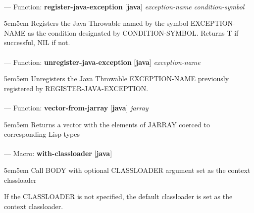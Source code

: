 \paragraph{}
\label{JAVA:REGISTER-JAVA-EXCEPTION}
--- Function: \textbf{register-java-exception} [\textbf{java}] \textit{exception-name condition-symbol}

\begin{adjustwidth}{5em}{5em}
Registers the Java Throwable named by the symbol EXCEPTION-NAME as the condition designated by CONDITION-SYMBOL.  Returns T if successful, NIL if not.
\end{adjustwidth}

\paragraph{}
\label{JAVA:UNREGISTER-JAVA-EXCEPTION}
--- Function: \textbf{unregister-java-exception} [\textbf{java}] \textit{exception-name}

\begin{adjustwidth}{5em}{5em}
Unregisters the Java Throwable EXCEPTION-NAME previously registered by REGISTER-JAVA-EXCEPTION.
\end{adjustwidth}

\paragraph{}
\label{JAVA:VECTOR-FROM-JARRAY}
--- Function: \textbf{vector-from-jarray} [\textbf{java}] \textit{jarray}

\begin{adjustwidth}{5em}{5em}
Returns a vector with the elements of JARRAY coerced to corresponding Lisp types
\end{adjustwidth}

\paragraph{}
\label{JAVA:WITH-CLASSLOADER}
--- Macro: \textbf{with-classloader} [\textbf{java}] \textit{}

\begin{adjustwidth}{5em}{5em}
Call BODY with optional CLASSLOADER argument set as the context classloader

If the CLASSLOADER is not specified, the default classloader is set as
the context classloader.
\end{adjustwidth}

